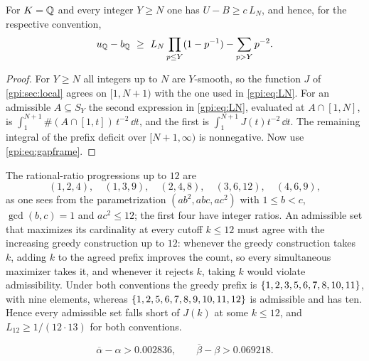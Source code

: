 \begin{lemma}\label{gpi:lem:prefix}
For $K=\mathbb{Q}$ and every integer $Y\ge N$ one has $U-B\ge c\,L_N$, and hence, for the respective
convention,
\[
 u_{\mathbb{Q}}-b_{\mathbb{Q}}\ \ge\ L_N\prod_{p\le Y}(1-p^{-1})-\sum_{p>Y}p^{-2}.
\]
\end{lemma}

\begin{proof}
For $Y\ge N$ all integers up to $N$ are $Y$-smooth, so the function $J$ of
\cref{gpi:sec:local} agrees on $[1,N+1)$ with the one used in \eqref{gpi:eq:LN}. For an
admissible $A\subseteq S_Y$ the second expression in \eqref{gpi:eq:LN}, evaluated at
$A\cap[1,N]$, is $\int_1^{N+1}\#(A\cap[1,t])\,t^{-2}\,\dd t$, and the first is
$\int_1^{N+1}J(t)t^{-2}\,\dd t$. The remaining integral of the prefix deficit over
$[N+1,\infty)$ is nonnegative. Now use \eqref{gpi:eq:gapframe}.
\end{proof}

\begin{example}\label{gpi:ex:twelve}
The rational-ratio progressions up to $12$ are
\[
 (1,2,4),\quad(1,3,9),\quad(2,4,8),\quad(3,6,12),\quad(4,6,9),
\]
as one sees from the parametrization $(ab^2,abc,ac^2)$ with $1\le b<c$,
$\gcd(b,c)=1$ and $ac^2\le12$; the first four have integer ratios. An admissible set that
maximizes its cardinality at every cutoff $k\le12$ must agree with the increasing greedy
construction up to $12$: whenever the greedy construction takes $k$, adding $k$ to the agreed
prefix improves the count, so every simultaneous maximizer takes it, and whenever it rejects
$k$, taking $k$ would violate admissibility. Under both conventions the greedy prefix is
$\{1,2,3,5,6,7,8,10,11\}$, with nine elements, whereas
$\{1,2,5,6,7,8,9,10,11,12\}$ is admissible and has ten. Hence every admissible set falls
short of $J(k)$ at some $k\le12$, and $L_{12}\ge1/(12\cdot13)$ for both conventions.
\end{example}

\begin{theorem}\label{gpi:thm:integer-gap}
\[
 \overline\alpha-\alpha>0.002836,\qquad\overline\beta-\beta>0.069218 .
\]
\end{theorem}

